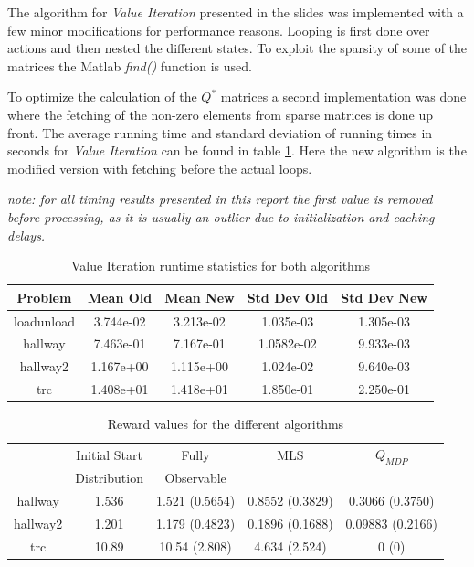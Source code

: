 \documentclass[10pt,a4paper]{article}
\begin{document}
The algorithm for \emph{Value Iteration} presented in the slides was implemented with a few minor modifications for performance reasons. 
Looping is first done over actions and then nested the different states. To exploit the sparsity of some of the matrices the Matlab \emph{find()} function is used.

To optimize the calculation of the $Q^{*}$ matrices a second implementation was done where the fetching of the non-zero elements from sparse matrices is done up front. 
The average running time and standard deviation of running times in seconds for \emph{Value Iteration} can be found in table \ref{table:vi}.
Here the new algorithm is the modified version with fetching before the actual loops.
\begin{framed}
\textit{note: for all timing results presented in this report the first value is removed before processing, as it is usually an outlier due to initialization and caching delays.}
\end{framed}
\newpage


\begin{table}
\centering
\begin{tabular}{ c || c | c || c | c}
Problem & Mean Old & Mean New & Std Dev Old & Std Dev New \\
\hline
loadunload & 3.744e-02 & 3.213e-02 & 1.035e-03 & 1.305e-03\\
hallway & 7.463e-01 & 7.167e-01 & 1.0582e-02 & 9.933e-03\\
hallway2 & 1.167e+00 & 1.115e+00 & 1.024e-02 & 9.640e-03 \\
trc & 1.408e+01 & 1.418e+01 & 1.850e-01 & 2.250e-01\\
\end{tabular}
\caption{Value Iteration runtime statistics for both algorithms}
\label{table:vi}
\end{table}

\begin{table}
\centering
\begin{tabular}{ c || c | c | c | c }
\hfill & Initial Start & Fully & MLS & $Q_{MDP}$\\
\hfill & Distribution &  Observable &  & \\
\hline
hallway & 1.536 & 1.521 (0.5654) & 0.8552 (0.3829) & 0.3066 (0.3750) \\
hallway2 & 1.201 & 1.179 (0.4823) & 0.1896 (0.1688) & 0.09883 (0.2166)\\
trc & 10.89 & 10.54 (2.808) & 4.634 (2.524) & 0 (0)
\\
\end{tabular}
\caption{Reward values for the different algorithms}
\label{table:rewards}
\end{table}
\end{document}
